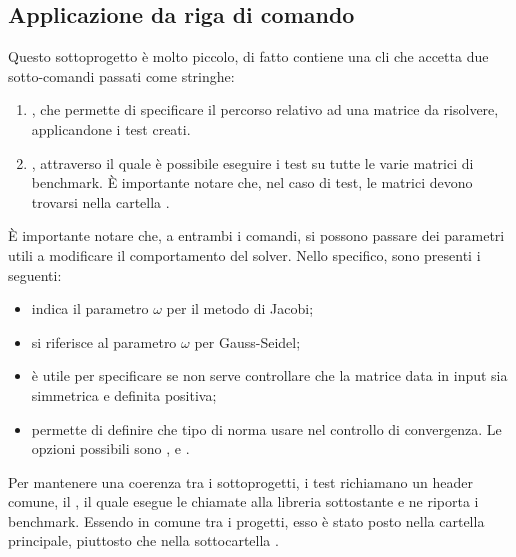 \subsection{Applicazione da riga di comando} \label{sec:cli}
Questo sottoprogetto è molto piccolo, di fatto contiene una cli che accetta due sotto-comandi passati come stringhe:

\begin{enumerate}
	\item {}, che permette di specificare il percorso relativo ad una matrice da risolvere, applicandone i test creati.
	\item {}, attraverso il quale è possibile eseguire i test su tutte le varie matrici di benchmark. È importante notare che, nel caso di test, le matrici devono trovarsi nella cartella .
\end{enumerate}

È importante notare che, a entrambi i comandi, si possono passare dei parametri utili a modificare il comportamento del solver. Nello specifico, sono presenti i seguenti:

\begin{itemize}
	\item {} indica il parametro $\omega$ per il metodo di Jacobi;
	\item {} si riferisce al parametro $\omega$ per Gauss-Seidel;
	\item {} è utile per specificare se non serve controllare che la matrice data in input sia simmetrica e definita positiva;
	\item {} permette di definire che tipo di norma usare nel controllo di convergenza. Le opzioni possibili sono ,  e .
\end{itemize}

Per mantenere una coerenza tra i sottoprogetti, i test richiamano un header comune, il , il quale esegue le chiamate alla libreria sottostante e ne riporta i benchmark. Essendo in comune tra i progetti, esso è stato posto nella cartella principale, piuttosto che nella sottocartella .


